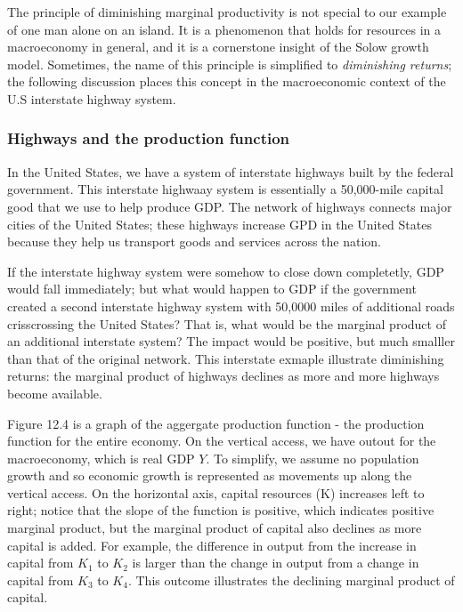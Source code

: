 \documentclass[11pt]{article} %
\begin{document}
The principle of diminishing marginal productivity  is not special to our example of one man alone on an island. It is a phenomenon that holds for resources in a macroeconomy in general, and it is a cornerstone insight of the Solow growth model. Sometimes, the name of this principle is simplified to \textit{diminishing returns}; the following discussion places this concept in the macroeconomic context of the U.S interstate highway system.
\subsubsection*{Highways and the production function}
In the United States, we have a system of interstate highways built by the federal government. This interstate highwaay system is essentially a 50,000-mile capital good that we use to help produce GDP. The network of highways connects major cities of the United States; these highways increase GPD in the United States because they help us transport goods and services across the nation.

If the interstate highway system were somehow to close down completetly, GDP would fall immediately; but what would happen to GDP if the government created a second interstate highway system with 50,0000 miles of additional roads crisscrossing the United States? That is, what would be the marginal product of an additional interstate system? The impact would be positive, but much smalller than that of the original network. This interstate exmaple illustrate diminishing returns: the marginal product of highways declines as more and more highways become available.

Figure 12.4 is a graph of the aggergate production function - the production function for the entire economy. On the vertical access, we have outout for the macroeconomy, which is real GDP \(Y\). To simplify, we assume no population growth and so economic growth is represented as movements up along the vertical access. On the horizontal axis, capital resources (K) increases left to right; notice that the slope of the function is positive, which indicates positive marginal product, but the marginal product of capital also declines as more capital is added. For example, the difference in output from the increase in capital from \(K_1\) to \(K_2\) is larger than the change in output from a change in capital from \(K_3\) to \(K_4\). This outcome illustrates the declining marginal product of capital.
\end{document}

